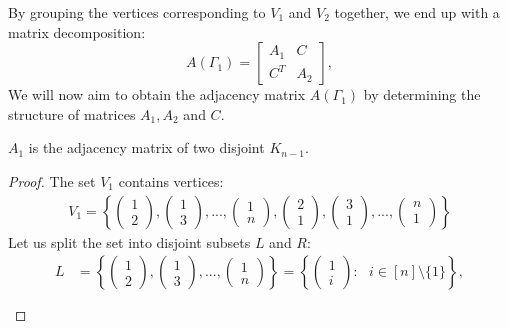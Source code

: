By grouping the vertices corresponding to $V_1$ and $V_2$ together, we end up with a matrix decomposition:
\[
A(\Gamma_1) =
\begin{bmatrix}
A_1 & C \\
C^T & A_2
\end{bmatrix},
\]
We will now aim to obtain the adjacency matrix $A(\Gamma_1)$ by determining the structure of matrices $A_1, A_2$ and $C$.

\begin{proposition}
    $A_1$ is the adjacency matrix of two disjoint \(K_{n-1}\).
    \end{proposition}
\begin{proof}
    The set $V_1$ contains vertices: \\
    \begin{align*}
        V_1 = \left\{ \begin{pmatrix} 1 \\ 2 \end{pmatrix}, \begin{pmatrix} 1 \\ 3 \end{pmatrix},..., \begin{pmatrix} 1 \\ n \end{pmatrix}, \begin{pmatrix} 2 \\ 1 \end{pmatrix}, \begin{pmatrix} 3 \\ 1 \end{pmatrix},..., \begin{pmatrix} n \\ 1 \end{pmatrix} \right\}
    \end{align*}
    Let us split the set into disjoint subsets \(L\) and \(R\):
    \begin{align*}
        L &= \left\{ \begin{pmatrix} 1 \\ 2 \end{pmatrix}, \begin{pmatrix} 1 \\ 3 \end{pmatrix},..., \begin{pmatrix} 1 \\ n \end{pmatrix}\right\} = \left \{ \begin{pmatrix} 1 \\ i \end{pmatrix} : \text{ }i \in [n]\setminus\{1\}\right \}, \\ \\

\end{align*}
\end{proof}
